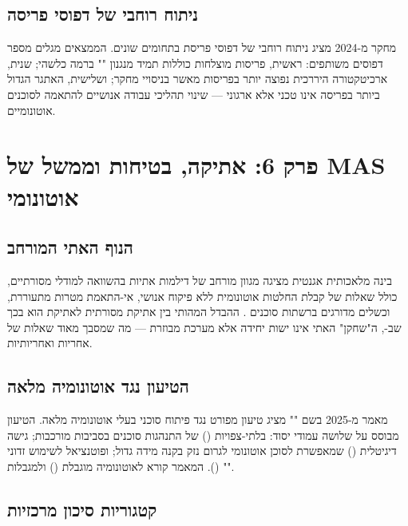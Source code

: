 \documentclass[12pt,a4paper]{article}
\begin{document}
\subsection{ניתוח רוחבי של דפוסי פריסה}

מחקר  מ-2024 \cite{ResearchGate2024} מציג ניתוח רוחבי של דפוסי פריסת  בתחומים שונים. הממצאים מגלים מספר דפוסים משותפים: ראשית, פריסות מוצלחות כוללות תמיד מנגנון "" ברמה כלשהי; שנית, ארכיטקטורה היררכית נפוצה יותר בפריסות  מאשר בניסויי מחקר; ושלישית, האתגר הגדול ביותר בפריסה אינו טכני אלא ארגוני --- שינוי תהליכי עבודה אנושיים להתאמה לסוכנים אוטונומיים.

\newpage

\section{פרק 6: אתיקה, בטיחות וממשל של MAS אוטונומי}

\subsection{הנוף האתי המורחב}

בינה מלאכותית אגנטית מציגה מגוון מורחב של דילמות אתיות בהשוואה למודלי  מסורתיים, כולל שאלות של קבלת החלטות אוטונומית ללא פיקוח אנושי, אי-התאמת מטרות מתעוררת, וכשלים מדורגים ברשתות סוכנים \cite{IBM_Ethics2024}. ההבדל המהותי בין אתיקת  מסורתית לאתיקת  הוא בכך שב-, ה"שחקן" האתי אינו ישות יחידה אלא מערכת מבוזרת --- מה שמסבך מאוד שאלות של אחריות ואחריותיות.

\subsection{הטיעון נגד אוטונומיה מלאה}

מאמר  מ-2025 \cite{arXiv2502} בשם "" מציג טיעון מפורט נגד פיתוח סוכני  בעלי אוטונומיה מלאה. הטיעון מבוסס על שלושה עמודי יסוד: בלתי-צפויות () של התנהגות סוכנים בסביבות מורכבות; גישה דיגיטלית () שמאפשרת לסוכן אוטונומי לגרום נזק בקנה מידה גדול; ופוטנציאל לשימוש זדוני (). המאמר קורא לאוטונומיה מוגבלת () ולמגבלות "".

\subsection{קטגוריות סיכון מרכזיות}
\end{document}
